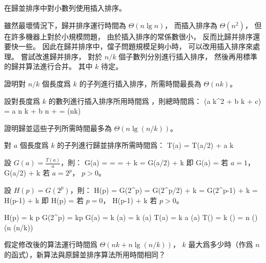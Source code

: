 \startsubject[
  title={Problems},
]
\startPROBLEM
在歸並排序中對小數列使用插入排序。

雖然最壞情況下，歸并排序運行時間為 $\Theta(n\lg n)$，
而插入排序為 $\Theta(n^2)$，
但在許多機器上對於小規模問題，
由於插入排序的常係數很小，
反而比歸并排序還要快一些。
因此在歸并排序中，儅子問題規模足夠小時，
可以改用插入排序來處理。
嘗試改進歸并排序，
對於 $n/k$ 個子數列分別進行插入排序，
然後再用標準的歸并算法進行合并。
其中 $k$ 待定。
\startigBase[a]

\item 證明對 $n/k$ 個長度爲 $k$ 的子列進行插入排序，所需時間最長為 $\Theta(nk)$。

\startANSWER
設對長度爲 $k$ 的數列進行插入排序所用時間爲 ，則總時間爲：
\startformula
{}(a k^2 + b k + c) = a n k + b n +  = \Theta(nk)
\stopformula
\stopANSWER

\item 證明歸並這些子列所需時間最多為 $\Theta(n \lg(n/k))$。

\startANSWER
對 $a$ 個長度爲 $k$ 的子列進行歸並排序所需時間爲：
\startformula
T(a) = \startcases
{}	\NC {} \NR
{} T(a/2) + a k \NC {} \NR
\stopcases
\stopformula

設 $G(a) = \frac{T(a)}{a}$，則：
\startformula\startalign
\NC G(a)	\NC =  \NR
\NC 		\NC =  \NR
\NC		\NC =  + k \NR
\NC		\NC = G(a/2) + k \NR
\stopalign\stopformula
即
\startformula
G(a) = \startcases
{}	\NC 若 $a = 1$，\NR
\NC G(a/2) + k \NC 若 $a = 2^p$， $p > 0$。\NR
\stopcases
\stopformula

設 $H(p) = G(2^p)$，則：
\startsplitformula\startalign
\NC H(p)	\NC = G(2^p) \NR
\NC		\NC = G(2^p/2) + k \NR
\NC		\NC = G(2^{p-1}) + k \NR
\NC		\NC = H(p-1) + k \NR
\stopalign\stopsplitformula
即
\startformula
H(p) = \startcases
{}	\NC 若 $p = 0$， \NR
\NC H(p-1) + k \NC 若 $p > 0$。 \NR
\stopcases
\stopformula

\startsplitformula\startalign
\NC H(p) \NC = k p \NR
\NC G(2^p) \NC = kp \NR
\NC G(a) \NC = k \lg(a) \NR
\NC {} \NC = k \lg(a) \NR
\NC T(a) \NC = k a \lg(a) \NR
\NC T() \NC = k  \lg() \NR
\NC		\NC = n \lg() \NR
\NC     \NC \Theta(n \lg(n/k)) \NR
\stopalign\stopsplitformula
\stopANSWER

\item 假定修改後的算法運行時間爲 $\Theta(nk+n \lg(n/k))$，
$k$ 最大爲多少時（作爲 $n$ 的函式），新算法與原歸並排序算法所用時間相同？

